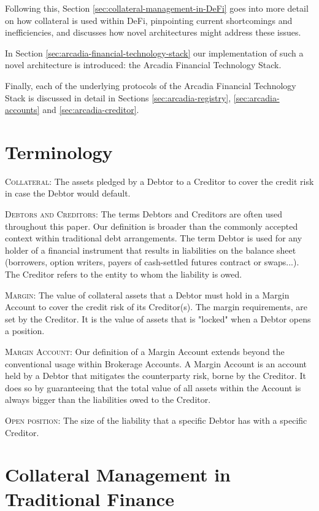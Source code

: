 \documentclass[sigconf,nonacm]{acmart}
\begin{document}
Following this, Section \ref{sec:collateral-management-in-DeFi} goes into more detail on how collateral is used within DeFi,
pinpointing current shortcomings and inefficiencies, and discusses how novel architectures might address these issues.

In Section \ref{sec:arcadia-financial-technology-stack} our implementation of such a novel architecture is introduced:
the Arcadia Financial Technology Stack.

Finally, each of the underlying protocols of the Arcadia Financial Technology Stack is discussed in detail 
in Sections \ref{sec:arcadia-registry}, \ref{sec:arcadia-accounts} and \ref{sec:arcadia-creditor}.

\section{Terminology}
\label{sec:terminology}
\textsc{Collateral:} The assets pledged by a Debtor to a Creditor to cover the credit risk in case the Debtor would default.

\textsc{Debtors and Creditors:} The terms Debtors and Creditors are often used throughout this paper.
Our definition is broader than the commonly accepted context within traditional debt arrangements.
The term Debtor is used for any holder of a financial instrument that results in liabilities on the balance sheet
(borrowers, option writers, payers of cash-settled futures contract or swaps...).
The Creditor refers to the entity to whom the liability is owed.

\textsc{Margin:} The value of collateral assets that a Debtor must hold in a Margin Account to cover the credit risk of its Creditor(s).
The margin requirements, are set by the Creditor.
It is the value of assets that is "locked" when a Debtor opens a position.

\textsc{Margin Account:} Our definition of a Margin Account extends beyond the conventional usage within Brokerage Accounts.
A Margin Account is an account held by a Debtor that mitigates the counterparty risk, borne by the Creditor.
It does so by guaranteeing that the total value of all assets within the Account is always bigger than the liabilities owed to the Creditor.

\textsc{Open position:} The size of the liability that a specific Debtor has with a specific Creditor.

\section{Collateral Management in Traditional Finance}
\label{sec:collateral-managemen-in-traditional-finance}
\end{document}
